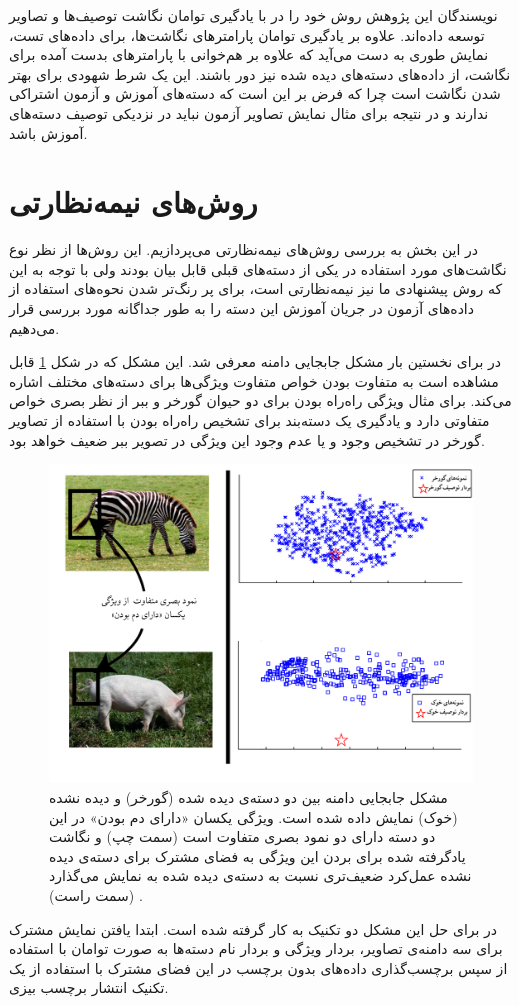 نویسندگان این پژوهش روش خود را در \cite{agnostic} با یادگیری توامان نگاشت توصیف‌ها و تصاویر توسعه داده‌اند. علاوه بر یادگیری توامان پارامترهای نگاشت‌ها، برای داده‌های تست، نمایش طوری به دست می‌آید که علاوه بر هم‌خوانی با پارامترهای بدست آمده برای نگاشت، از داده‌های دسته‌های دیده شده نیز دور باشند. این یک شرط شهودی برای بهتر شدن نگاشت است چرا که فرض بر این است که دسته‌های آموزش و آزمون اشتراکی ندارند و در نتیجه برای مثال نمایش تصاویر آزمون نباید در نزدیکی توصیف دسته‌های آموزش باشد.

\section{روش‌های نیمه‌نظارتی}
در این بخش به بررسی روش‌های نیمه‌نظارتی می‌پردازیم. این روش‌ها از نظر نوع نگاشت‌های مورد استفاده در یکی از دسته‌های قبلی قابل بیان بودند ولی با توجه به این که روش پیشنهادی ما نیز نیمه‌نظارتی است، برای پر رنگ‌تر شدن نحوه‌های استفاده از داده‌های آزمون در جریان آموزش این دسته را به طور جداگانه مورد بررسی قرار می‌دهیم.

در \cite{Fu2014} برای نخستین بار مشکل جابجایی دامنه معرفی شد. این مشکل که در شکل 
\ref{fig:domain_shift}
قابل مشاهده است به متفاوت بودن خواص متفاوت ویژگی‌ها برای دسته‌های مختلف اشاره می‌کند. برای مثال ویژگی راه‌راه بودن برای دو حیوان گورخر و ببر از نظر بصری خواص متفاوتی دارد و یادگیری یک دسته‌بند برای تشخیص راه‌راه بودن با استفاده از تصاویر گورخر در تشخیص وجود و یا عدم وجود این ویژگی در تصویر ببر ضعیف خواهد بود.

\begin{figure}[h]
\centering
\includegraphics[width=0.7\linewidth]{images/domain_shift}
\caption[مشکل جابجایی دامنه]{
مشکل جابجایی دامنه بین دو دسته‌ی دیده شده (گورخر) و دیده نشده (خوک) نمایش داده شده است. ویژگی یکسان «دارای دم بودن» در این دو دسته دارای دو نمود بصری متفاوت است (سمت چپ) و نگاشت یادگرفته شده برای بردن این ویژگی به فضای مشترک برای دسته‌ی دیده نشده عمل‌کرد ضعیف‌تری نسبت به دسته‌ی دیده شده به نمایش می‌گذارد (سمت راست) 
\cite{Fu2014}.}
\label{fig:domain_shift}
\end{figure}
 در \cite{Fu2014} 
برای حل این مشکل دو تکنیک به کار گرفته شده است. ابتدا یافتن نمایش مشترک برای سه دامنه‌ی تصاویر، بردار ویژگی و بردار نام دسته‌ها به صورت توامان با استفاده از 
\cite{cca}
سپس برچسب‌گذاری داده‌های بدون برچسب در این فضای مشترک با استفاده از یک تکنیک انتشار برچسب بیزی. 

